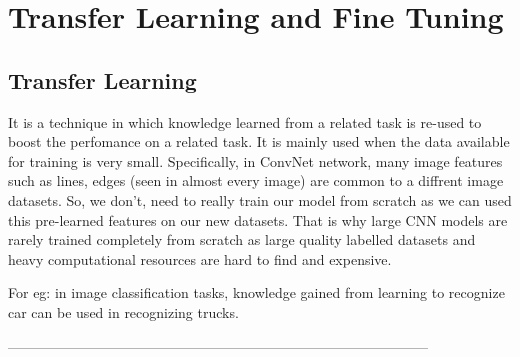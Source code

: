 \section{Transfer Learning and Fine Tuning}

\subsection{Transfer Learning}
It is a technique in which knowledge learned from a  related task is re-used to boost the perfomance on a related task.\cite{tf} It is mainly used when the data available for training is very small.
Specifically, in ConvNet network, many image features such as lines, edges (seen in almost every image) are common to a diffrent image datasets. So, we don't, need to really train our model from scratch as we can used this pre-learned features on our new datasets. That is why large CNN models are rarely trained completely from scratch as large quality labelled datasets and heavy computational resources are hard to find and expensive.\par\vspace{1em}
For eg: in image classification  tasks, knowledge gained from learning to recognize car can be used in recognizing trucks.\par\vspace{1em}
------------------------------------------------------------------------------------------

